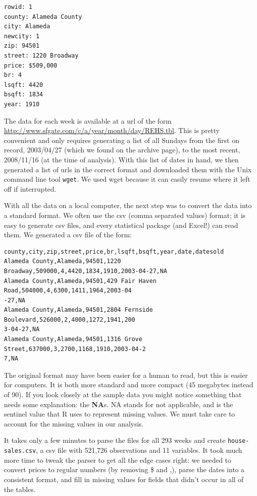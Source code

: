 \documentclass[oneside]{article}
\begin{document}
\begin{verbatim}
rowid: 1
county: Alameda County
city: Alameda
newcity: 1
zip: 94501
street: 1220 Broadway
price: $509,000
br: 4
lsqft: 4420
bsqft: 1834
year: 1910
\end{verbatim}

The data for each week is available at a url of the form \url{http://www.sfgate.com/c/a/year/month/day/REHS.tbl}.  This is pretty convenient and only requires generating a list of all Sundays from the first on record, 2003/04/27 (which we found on the archive page), to the most recent, 2008/11/16 (at the time of analysis).  With this list of dates in hand, we then generated a list of urls in the correct format and downloaded them with the Unix command line tool {\tt wget}. We used wget because it can easily resume where it left off if interrupted.

With all the data on a local computer, the next step was to convert the data into a standard format.  We often use the csv (comma separated values) format; it is easy to generate  csv files, and every statistical package (and Excel!) can read them.  We generated a csv file of the form:

\begin{verbatim}
county,city,zip,street,price,br,lsqft,bsqft,year,date,datesold
Alameda County,Alameda,94501,1220 Broadway,509000,4,4420,1834,1910,2003-04-27,NA
Alameda County,Alameda,94501,429 Fair Haven Road,504000,4,6300,1411,1964,2003-04
-27,NA
Alameda County,Alameda,94501,2804 Fernside Boulevard,526000,2,4000,1272,1941,200
3-04-27,NA
Alameda County,Alameda,94501,1316 Grove Street,637000,3,2700,1168,1910,2003-04-2
7,NA
\end{verbatim}

The original format may have been easier for a human to read, but this is easier for computers.  It is both more standard and more compact (45 megabytes instead of 90).  If you look closely at the sample data you might notice something that needs some explanation: the {\bf NA}s.  NA stands for not applicable, and is the sentinel value that R uses to represent missing values. We must take care to account for the missing values in our analysis.

It takes only a few minutes to parse the files for all 293 weeks and create {\tt house-sales.csv}, a csv file with 521,726 observations and 11 variables.  It took much more time to tweak the parser to get all the edge cases right: we needed to convert prices to regular numbers (by removing \$ and ,), parse the dates into a consistent format, and fill in missing values for fields that didn't occur in all of the tables. 
\end{document}
